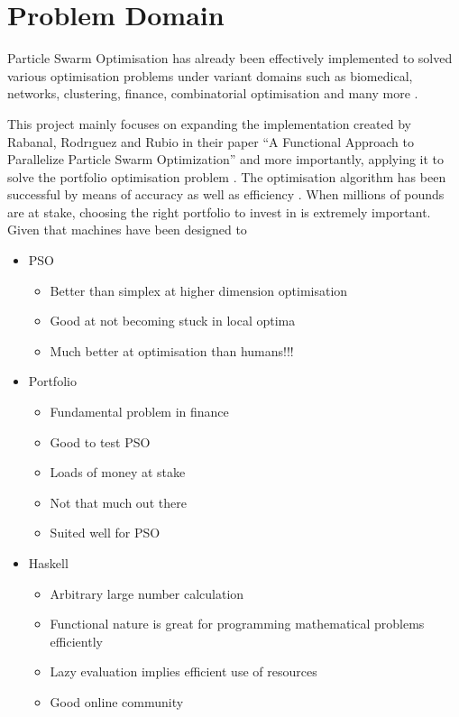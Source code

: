 \documentclass{pdfmx4020}
\begin{document}

\chapter{Problem Domain}
  
  Particle Swarm Optimisation has already been effectively implemented to solved various optimisation problems \cite{pso_app,pso_app2,pso_app3} under variant domains such as biomedical, networks, clustering, finance, combinatorial optimisation and many more \cite{pso_app_main}. 

  This project mainly focuses on expanding the implementation created by Rabanal, Rodrıguez and Rubio in their paper ``A Functional Approach to Parallelize Particle Swarm Optimization'' and more importantly, applying it to solve the portfolio optimisation problem \cite{marko2}. The optimisation algorithm has been successful by means of accuracy as well as efficiency \cite{haskellPSO}. When millions of pounds are at stake, choosing the right portfolio to invest in is extremely important. Given that machines have been designed to  

  \begin{itemize}
    \item PSO
    \begin{itemize}
      \item Better than simplex at higher dimension optimisation
      \item Good at not becoming stuck in local optima
      \item Much better at optimisation than humans!!!
    \end{itemize}
    \item Portfolio
    \begin{itemize}
      \item Fundamental problem in finance
      \item Good to test PSO
      \item Loads of money at stake
      \item Not that much out there
      \item Suited well for PSO
    \end{itemize}
    \item Haskell
    \begin{itemize}
      \item Arbitrary large number calculation
      \item Functional nature is great for programming mathematical problems efficiently
      \item Lazy evaluation implies efficient use of resources
      \item Good online community
    \end{itemize}
  \end{itemize}
\end{document}

